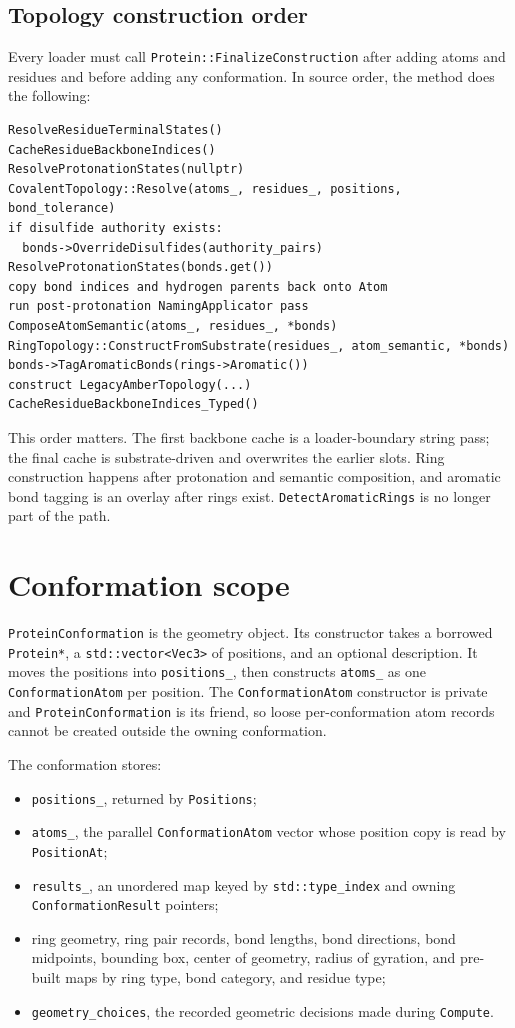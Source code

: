 \documentclass[11pt]{article}
\newcommand{\code}[1]{\texttt{#1}}
\begin{document}
\subsection{Topology construction order}

Every loader must call \code{Protein::FinalizeConstruction} after adding
atoms and residues and before adding any conformation. In source order, the
method does the following:

\begin{lstlisting}
ResolveResidueTerminalStates()
CacheResidueBackboneIndices()
ResolveProtonationStates(nullptr)
CovalentTopology::Resolve(atoms_, residues_, positions, bond_tolerance)
if disulfide authority exists:
  bonds->OverrideDisulfides(authority_pairs)
ResolveProtonationStates(bonds.get())
copy bond indices and hydrogen parents back onto Atom
run post-protonation NamingApplicator pass
ComposeAtomSemantic(atoms_, residues_, *bonds)
RingTopology::ConstructFromSubstrate(residues_, atom_semantic, *bonds)
bonds->TagAromaticBonds(rings->Aromatic())
construct LegacyAmberTopology(...)
CacheResidueBackboneIndices_Typed()
\end{lstlisting}

This order matters. The first backbone cache is a loader-boundary string pass;
the final cache is substrate-driven and overwrites the earlier slots. Ring
construction happens after protonation and semantic composition, and aromatic
bond tagging is an overlay after rings exist. \code{DetectAromaticRings} is no
longer part of the path.

\section{Conformation scope}

\code{ProteinConformation} is the geometry object. Its constructor takes a
borrowed \code{Protein*}, a \code{std::vector<Vec3>} of positions, and an
optional description. It moves the positions into \code{positions\_}, then
constructs \code{atoms\_} as one \code{ConformationAtom} per position.
The \code{ConformationAtom} constructor is private and
\code{ProteinConformation} is its friend, so loose per-conformation atom
records cannot be created outside the owning conformation.

The conformation stores:

\begin{itemize}
\item \code{positions\_}, returned by \code{Positions};
\item \code{atoms\_}, the parallel \code{ConformationAtom} vector whose
position copy is read by \code{PositionAt};
\item \code{results\_}, an unordered map keyed by \code{std::type\_index}
and owning \code{ConformationResult} pointers;
\item ring geometry, ring pair records, bond lengths, bond directions,
bond midpoints, bounding box, center of geometry, radius of gyration, and
pre-built maps by ring type, bond category, and residue type;
\item \code{geometry\_choices}, the recorded geometric decisions made during
\code{Compute}.
\end{itemize}
\end{document}
